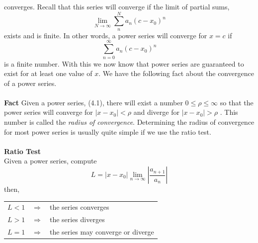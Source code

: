 \documentclass[10pt,reqno]{book}
\theoremstyle{definition}
\begin{document}
	converges. Recall that this series will converge if the limit of partial sums,
	\[ \lim_{N\to\infty} \sum_{n}^{N} a_n(c-x_0)^n \]
	exists and is finite. In other words, a power series will converge for $ x = c $ if 
	\[ \sum_{n = 0}^{\infty} a_n(c - x_0)^n \]
	is a finite number. With this we now know that power series are guaranteed to exist for at least one value of $ x $. We have the following fact about the convergence of a power series.\\ \\
	\textbf{Fact} Given a power series, (4.1), there will exist a number $ 0 \leq \rho \leq \infty $ so that the power series will converge for $ |x - x_0| < \rho $ and diverge for $ |x - x_0| > \rho $ . This number is called the \textit{radius of convergence}. Determining the radius of convergence for most power series is usually quite simple if we use the ratio test.\\ \\
	\textbf{Ratio Test}\\
	Given a power series, compute 
	\[ L = |x - x_0| \lim_{n\to\infty} \left| \frac{a_{n+1}}{a_n} \right| \]
	then,
	
	\begin{center}
		\begin{tabular}{lll}
			$ L < 1 $ & $ \Rightarrow $ & the series converges\\
			$ L > 1 $ & $ \Rightarrow $ & the series diverges\\
			$ L = 1 $ & $ \Rightarrow $ & the series may converge or diverge
		\end{tabular}
	\end{center}
	
\end{document}
